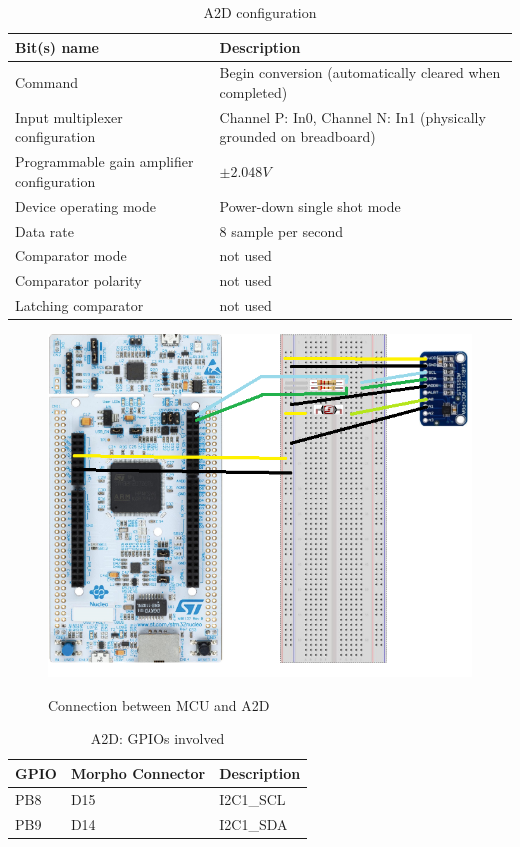 \begin{table}[H]
\centering
\begin{tabular}{p{}p{}}

\textbf{Bit(s) name}&\textbf{Description}\\ \hline
Command & Begin conversion (automatically cleared when completed) \\ 
Input multiplexer configuration & Channel P: In0, Channel N: In1 (physically grounded on breadboard)\\ 
Programmable gain amplifier configuration & $\pm 2.048V$\\
Device operating mode & Power-down single shot mode\\
Data rate & 8 sample per second \\
Comparator mode & not used \\
Comparator polarity & not used \\
Latching comparator & not used \\ \hline
\end{tabular}
\caption{A2D configuration}
\end{table}

\begin{figure}[H]
\centering
\includegraphics{Immagini/07}
\label{07}
\caption{Connection between MCU and A2D}
\end{figure}

\begin{table}[H]
\centering
\begin{tabular}{p{}p{}p{}}

\textbf{GPIO}&\textbf{Morpho Connector}&\textbf{Description}\\ \hline
PB8 & D15 & I2C1\_SCL\\ 
PB9 & D14 & I2C1\_SDA\\ 
\hline
\end{tabular}
\caption{A2D: GPIOs involved}
\end{table}
